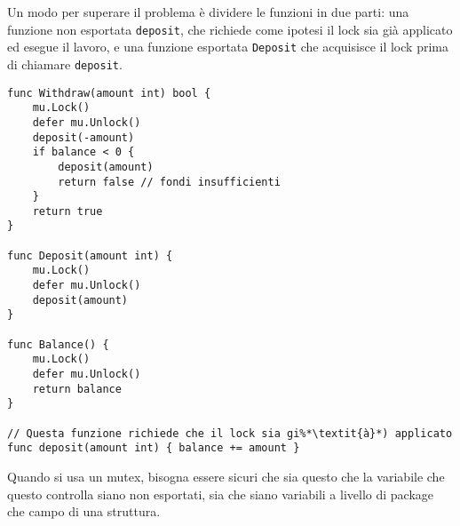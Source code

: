 \documentclass[../../thesis.tex]{subfiles}
\begin{document}
    Un modo per superare il problema è dividere le funzioni in due parti: una funzione non esportata \verb"deposit", che richiede come ipotesi il lock sia già applicato ed esegue il lavoro, e una funzione esportata \verb"Deposit" che acquisisce il lock prima di chiamare \verb"deposit".
    \begin{lstlisting}[frame = single,label={lst:lstlisting9-2.5}]
func Withdraw(amount int) bool {
    mu.Lock()
    defer mu.Unlock()
    deposit(-amount)
    if balance < 0 {
        deposit(amount)
        return false // fondi insufficienti
    }
    return true
}

func Deposit(amount int) {
    mu.Lock()
    defer mu.Unlock()
    deposit(amount)
}

func Balance() {
    mu.Lock()
    defer mu.Unlock()
    return balance
}

// Questa funzione richiede che il lock sia gi%*\textit{à}*) applicato
func deposit(amount int) { balance += amount }
    \end{lstlisting}
    Quando si usa un mutex, bisogna essere sicuri che sia questo che la variabile che questo controlla siano non esportati, sia che siano variabili a livello di package che campo di una struttura.
\end{document}
